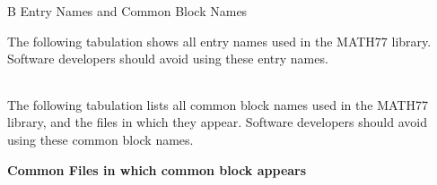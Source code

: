 \documentclass[twoside]{MATH77}
\begin{document}
\begapp B Entry Names and Common Block Names

{\normalsize The following tabulation shows all entry names used in the MATH77 library.
Software developers should avoid using these entry names.}

\tablehead{}
\tabletail{}
\begin{supertabular}{@{}*{11}{@{\ }l}}

\end{supertabular}\vspace{10pt}

\pagebreak
{\normalsize The following tabulation lists all common block names used in the
MATH77 library, and the files in which they appear. Software developers should
avoid using these common block names.}\vspace{10pt}

{\large \bf Common \hspace{.5in}Files in which common block appears}

\begin{tabular}{@{/ }l@{ /\quad}l*{10}{@{\ \,}l}}

\end{tabular}
\end{document}

